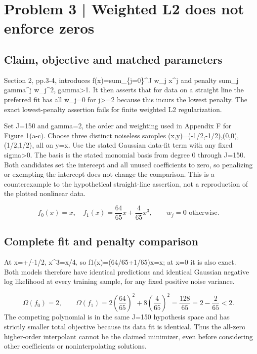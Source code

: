 \documentclass[10pt]{article}
\begin{document}
\section*{Problem 3 | Weighted L2 does not enforce zeros}
\subsection*{Claim, objective and matched parameters}
Section 2, pp.3-4, introduces f(x)=sum\_\{j=0\}\textasciicircum{}J w\_j x\textasciicircum{}j and penalty sum\_j gamma\textasciicircum{}j w\_j\textasciicircum{}2, gamma>1. It then asserts that for data on a straight line the preferred fit has all w\_j=0 for j>=2 because this incurs the lowest penalty. The exact lowest-penalty assertion fails for finite weighted L2 regularization.\par
Set J=150 and gamma=2, the order and weighting used in Appendix F for Figure 1(a-c). Choose three distinct noiseless samples (x,y)=(-1/2,-1/2),(0,0),(1/2,1/2), all on y=x. Use the stated Gaussian data-fit term with any fixed sigma>0. The basis is the stated monomial basis from degree 0 through J=150. Both candidates set the intercept and all unused coefficients to zero, so penalizing or exempting the intercept does not change the comparison. This is a counterexample to the hypothetical straight-line assertion, not a reproduction of the plotted nonlinear data.\par
\[f_0(x)=x,\quad f_1(x)=\frac{64}{65}x+\frac{4}{65}x^3,\qquad w_j=0\text{ otherwise}.\]\par
\subsection*{Complete fit and penalty comparison}
At x=+/-1/2, x\textasciicircum{}3=x/4, so f1(x)=(64/65+1/65)x=x; at x=0 it is also exact. Both models therefore have identical predictions and identical Gaussian negative log likelihood at every training sample, for any fixed positive noise variance.\par
\[\Omega(f_0)=2,\qquad \Omega(f_1)=2\left(\frac{64}{65}\right)^2+8\left(\frac4{65}\right)^2=\frac{128}{65}=2-\frac2{65}<2.\] The competing polynomial is in the same J=150 hypothesis space and has strictly smaller total objective because its data fit is identical. Thus the all-zero higher-order interpolant cannot be the claimed minimizer, even before considering other coefficients or noninterpolating solutions.\par
\end{document}
